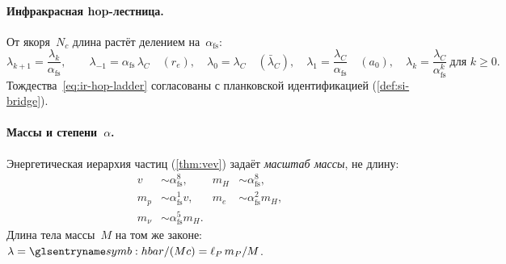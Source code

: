 \paragraph{Инфракрасная hop-лестница.}
От якоря~$N_c$ длина растёт делением на~$\alpha_{\mathrm{fs}}$:
\begin{equation}
\label{eq:ir-hop-ladder}
  \lambda_{k+1}=\frac{\lambda_k}{\alpha_{\mathrm{fs}}},\qquad
  \lambda_{-1}=\alpha_{\mathrm{fs}}\,\lambda_C\quad(r_e),\quad
  \lambda_0=\lambda_C\quad(\bar\lambda_C),\quad
  \lambda_1=\frac{\lambda_C}{\alpha_{\mathrm{fs}}}\quad(a_0),\quad
  \lambda_k=\frac{\lambda_C}{\alpha_{\mathrm{fs}}^{k}}\ \text{для }k\geq 0.
\end{equation}
Тождества~\eqref{eq:ir-hop-ladder} согласованы с планковской идентификацией (\cref{def:si-bridge}).

\paragraph{Массы и степени~$\alpha$.}
Энергетическая иерархия частиц (\cref{thm:vev}) задаёт \emph{масштаб массы}, не длину:
\begin{align}
  v &\sim \alpha_{\mathrm{fs}}^{8}, &
  m_H &\sim \alpha_{\mathrm{fs}}^{8}, \\
  m_p &\sim \alpha_{\mathrm{fs}}^{1} v, &
  m_e &\sim \alpha_{\mathrm{fs}}^{2} m_H, \\
  m_\nu &\sim \alpha_{\mathrm{fs}}^{5} m_H.
\end{align}
Длина тела массы~$M$ на том же законе:
$\lambda=\planckHbar/(Mc)=\ell_P\,m_P/M$.

